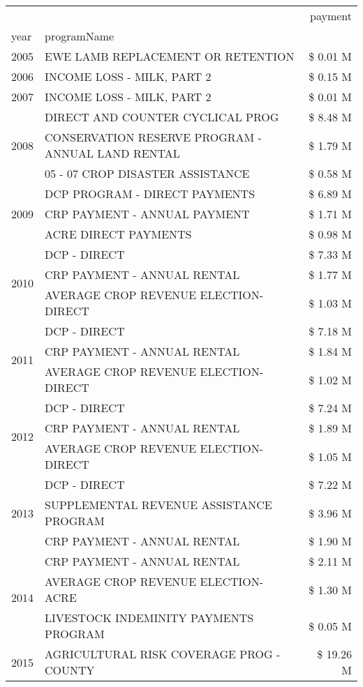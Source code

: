 \begin{tabular}{llr}
\toprule
 &  & payment \\
year & programName &  \\
\midrule
2005 & EWE LAMB REPLACEMENT OR RETENTION & \$ 0.01 M \\
\cline{1-3}
2006 & INCOME LOSS - MILK, PART 2 & \$ 0.15 M \\
\cline{1-3}
2007 & INCOME LOSS - MILK, PART 2 & \$ 0.01 M \\
\cline{1-3}
\multirow[t]{3}{*}{2008} & DIRECT AND COUNTER CYCLICAL PROG & \$ 8.48 M \\
 & CONSERVATION RESERVE PROGRAM - ANNUAL LAND RENTAL & \$ 1.79 M \\
 & 05 - 07 CROP DISASTER ASSISTANCE & \$ 0.58 M \\
\cline{1-3}
\multirow[t]{3}{*}{2009} & DCP PROGRAM - DIRECT PAYMENTS & \$ 6.89 M \\
 & CRP PAYMENT - ANNUAL PAYMENT & \$ 1.71 M \\
 & ACRE DIRECT PAYMENTS & \$ 0.98 M \\
\cline{1-3}
\multirow[t]{3}{*}{2010} & DCP - DIRECT & \$ 7.33 M \\
 & CRP PAYMENT - ANNUAL RENTAL & \$ 1.77 M \\
 & AVERAGE CROP REVENUE ELECTION-DIRECT & \$ 1.03 M \\
\cline{1-3}
\multirow[t]{3}{*}{2011} & DCP - DIRECT & \$ 7.18 M \\
 & CRP PAYMENT - ANNUAL RENTAL & \$ 1.84 M \\
 & AVERAGE CROP REVENUE ELECTION-DIRECT & \$ 1.02 M \\
\cline{1-3}
\multirow[t]{3}{*}{2012} & DCP - DIRECT & \$ 7.24 M \\
 & CRP PAYMENT - ANNUAL RENTAL & \$ 1.89 M \\
 & AVERAGE CROP REVENUE ELECTION-DIRECT & \$ 1.05 M \\
\cline{1-3}
\multirow[t]{3}{*}{2013} & DCP - DIRECT & \$ 7.22 M \\
 & SUPPLEMENTAL REVENUE ASSISTANCE PROGRAM & \$ 3.96 M \\
 & CRP PAYMENT - ANNUAL RENTAL & \$ 1.90 M \\
\cline{1-3}
\multirow[t]{3}{*}{2014} & CRP PAYMENT - ANNUAL RENTAL & \$ 2.11 M \\
 & AVERAGE CROP REVENUE ELECTION-ACRE & \$ 1.30 M \\
 & LIVESTOCK INDEMINITY PAYMENTS PROGRAM & \$ 0.05 M \\
\cline{1-3}
\multirow[t]{3}{*}{2015} & AGRICULTURAL RISK COVERAGE PROG - COUNTY & \$ 19.26 M \\

\end{tabular}
